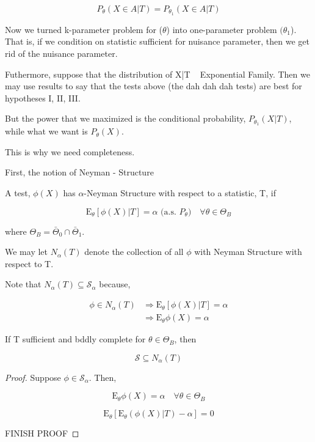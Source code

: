 \documentclass[11pt,fleqn]{book} %
\newcommand{\E}{\mathrm{E}}
\begin{document}
		$$P_\theta (X \in A |T ) = P_{\theta_1} (X \in A | T) $$ 

Now we turned k-parameter problem for ($\theta$) into one-parameter problem $(\theta_1$). That is, if we condition on statistic sufficient for nuisance parameter, then we get rid of the nuisance parameter. 

Futhermore, suppose that the distribution of X|T ~ Exponential Family. Then we may use results to say that the tests above (the dah dah dah tests) are best for hypotheses I, II, III. 

But the power that we maximized is the conditional probability, $P_{\theta_1} (X | T)$, while what we want is $P_\theta (X)$. 

This is why we need completeness. 

First, the notion of Neyman - Structure

\begin{definition}
	A test, $\phi(X)$ has $\alpha$-Neyman Structure with respect to a statistic, T, if 

			$$\E_\theta [\phi(X)|T] = \alpha \text{ (a.s. } P_\theta) \quad \forall \theta \in \Theta_B $$

	where $\Theta_B = \bar{\Theta}_0 \cap \bar{\Theta}_1$. 

	We may let $N_\alpha (T)$ denote the collection of all $\phi$ with Neyman Structure with respect to T. 

	Note that $N_\alpha (T) \subseteq \mathscr{S}_\alpha$ because, 

			\begin{align*}
				\phi \in N_\alpha(T) &\Rightarrow \E_\theta [\phi(X) | T] = \alpha\\
					&\Rightarrow \E_\theta \phi(X) = \alpha
			\end{align*}


\end{definition}

\begin{theorem}[4.2]
	If T sufficient and bddly complete for $\theta \in \Theta_B$, then 

			$$\mathscr{S} \subseteq N_\alpha (T)$$
\end{theorem}

\begin{proof}
	Suppose $\phi \in \mathscr{S}_\alpha$. Then, 

			$$\E_\theta \phi(X) = \alpha \quad \forall \theta \in \Theta_B$$

			$$\E_\theta [\E_{\theta} (\phi(X) |T) - \alpha]= 0 $$

			FINISH PROOF
\end{proof}
\end{document}
